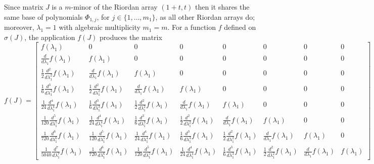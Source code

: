 Since matrix $J$ is a $m$-minor of the Riordan array $\left(1+t, t\right)$ then
it shares the same base of polynomials $\Phi_{1, j}$, for
$j\in\lbrace1,\ldots,m_{1} \rbrace$, as all other Riordan arrays do; moreover,
$\lambda_{1}=1$ with algebraic multiplicity $m_{1}=m$. For a function $f$
defined on $\sigma(J)$, the application $f(J)$ produces the matrix
\begin{displaymath}
f{\left (J \right )} = \left[\begin{matrix}f{\left (\lambda_{1} \right )} & 0 & 0 & 0 & 0 & 0 & 0 & 0\\\frac{d}{d \lambda_{1}} f{\left (\lambda_{1} \right )} & f{\left (\lambda_{1} \right )} & 0 & 0 & 0 & 0 & 0 & 0\\\frac{1}{2} \frac{d^{2}}{d \lambda_{1}^{2}}  f{\left (\lambda_{1} \right )} & \frac{d}{d \lambda_{1}} f{\left (\lambda_{1} \right )} & f{\left (\lambda_{1} \right )} & 0 & 0 & 0 & 0 & 0\\\frac{1}{6} \frac{d^{3}}{d \lambda_{1}^{3}}  f{\left (\lambda_{1} \right )} & \frac{1}{2} \frac{d^{2}}{d \lambda_{1}^{2}}  f{\left (\lambda_{1} \right )} & \frac{d}{d \lambda_{1}} f{\left (\lambda_{1} \right )} & f{\left (\lambda_{1} \right )} & 0 & 0 & 0 & 0\\\frac{1}{24} \frac{d^{4}}{d \lambda_{1}^{4}}  f{\left (\lambda_{1} \right )} & \frac{1}{6} \frac{d^{3}}{d \lambda_{1}^{3}}  f{\left (\lambda_{1} \right )} & \frac{1}{2} \frac{d^{2}}{d \lambda_{1}^{2}}  f{\left (\lambda_{1} \right )} & \frac{d}{d \lambda_{1}} f{\left (\lambda_{1} \right )} & f{\left (\lambda_{1} \right )} & 0 & 0 & 0\\\frac{1}{120} \frac{d^{5}}{d \lambda_{1}^{5}}  f{\left (\lambda_{1} \right )} & \frac{1}{24} \frac{d^{4}}{d \lambda_{1}^{4}}  f{\left (\lambda_{1} \right )} & \frac{1}{6} \frac{d^{3}}{d \lambda_{1}^{3}}  f{\left (\lambda_{1} \right )} & \frac{1}{2} \frac{d^{2}}{d \lambda_{1}^{2}}  f{\left (\lambda_{1} \right )} & \frac{d}{d \lambda_{1}} f{\left (\lambda_{1} \right )} & f{\left (\lambda_{1} \right )} & 0 & 0\\\frac{1}{720} \frac{d^{6}}{d \lambda_{1}^{6}}  f{\left (\lambda_{1} \right )} & \frac{1}{120} \frac{d^{5}}{d \lambda_{1}^{5}}  f{\left (\lambda_{1} \right )} & \frac{1}{24} \frac{d^{4}}{d \lambda_{1}^{4}}  f{\left (\lambda_{1} \right )} & \frac{1}{6} \frac{d^{3}}{d \lambda_{1}^{3}}  f{\left (\lambda_{1} \right )} & \frac{1}{2} \frac{d^{2}}{d \lambda_{1}^{2}}  f{\left (\lambda_{1} \right )} & \frac{d}{d \lambda_{1}} f{\left (\lambda_{1} \right )} & f{\left (\lambda_{1} \right )} & 0\\\frac{1}{5040} \frac{d^{7}}{d \lambda_{1}^{7}}  f{\left (\lambda_{1} \right )} & \frac{1}{720} \frac{d^{6}}{d \lambda_{1}^{6}}  f{\left (\lambda_{1} \right )} & \frac{1}{120} \frac{d^{5}}{d \lambda_{1}^{5}}  f{\left (\lambda_{1} \right )} & \frac{1}{24} \frac{d^{4}}{d \lambda_{1}^{4}}  f{\left (\lambda_{1} \right )} & \frac{1}{6} \frac{d^{3}}{d \lambda_{1}^{3}}  f{\left (\lambda_{1} \right )} & \frac{1}{2} \frac{d^{2}}{d \lambda_{1}^{2}}  f{\left (\lambda_{1} \right )} & \frac{d}{d \lambda_{1}} f{\left (\lambda_{1} \right )} & f{\left (\lambda_{1} \right )}\end{matrix}\right]
\end{displaymath}
